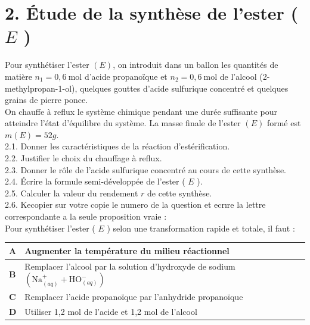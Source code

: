 \section*{2. Étude de la synthèse de l'ester ( $E$ )}
Pour synthétiser l'ester $(E)$, on introduit dans un ballon les quantités de matière $n_{1}=0,6 \mathrm{~mol}$ d'acide propanoïque et $n_{2}=0,6 \mathrm{~mol}$ de l'alcool (2-methylpropan-1-ol), quelques gouttes d'acide sulfurique concentré et quelques grains de pierre ponce.\\
On chauffe à reflux le système chimique pendant une durée suffisante pour atteindre l'état d'équilibre du système. La masse finale de l'ester $(E)$ formé est $m(E)=52 g$.\\
2.1. Donner les caractéristiques de la réaction d'estérification.\\
2.2. Justifier le choix du chauffage à reflux.\\
2.3. Donner le rôle de l'acide sulfurique concentré au cours de cette synthèse.\\
2.4. Écrire la formule semi-développée de l'ester ( $E$ ).\\
2.5. Calculer la valeur du rendement $r$ de cette synthèse.\\
2.6. Kecopier sur votre copie le numero de la question et ecrıre la lettre correspondante a la seule proposition vraie :\\
Pour synthétiser l'ester ( $E$ ) selon une transformation rapide et totale, il faut :

\begin{center}
\begin{tabular}{|l|l|}
\hline
$\mathbf{A}$ & Augmenter la température du milieu réactionnel \\
\hline
$\mathbf{B}$ & Remplacer l'alcool par la solution d'hydroxyde de sodium $\left(\mathrm{Na}_{(a q)}^{+}+\mathrm{HO}_{(a q)}^{-}\right)$ \\
\hline
$\mathbf{C}$ & Remplacer l'acide propanoïque par l'anhydride propanoïque \\
\hline
$\mathbf{D}$ & Utiliser 1,2 mol de l'acide et 1,2 mol de l'alcool \\
\hline
\end{tabular}
\end{center}


